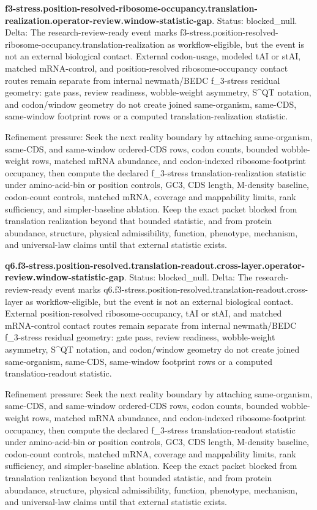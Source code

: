 \textbf{f3-stress.position-resolved-ribosome-occupancy.translation-realization.operator-review.window-statistic-gap}. Status: blocked\_null. Delta: The research-review-ready event marks f3-stress.position-resolved-ribosome-occupancy.translation-realization as workflow-eligible, but the event is not an external biological contact. External codon-usage, modeled tAI or stAI, matched mRNA-control, and position-resolved ribosome-occupancy contact routes remain separate from internal newmath/BEDC f\_3-stress residual geometry: gate pass, review readiness, wobble-weight asymmetry, S\textasciicircum{}QT notation, and codon/window geometry do not create joined same-organism, same-CDS, same-window footprint rows or a computed translation-realization statistic.

Refinement pressure: Seek the next reality boundary by attaching same-organism, same-CDS, and same-window ordered-CDS rows, codon counts, bounded wobble-weight rows, matched mRNA abundance, and codon-indexed ribosome-footprint occupancy, then compute the declared f\_3-stress translation-realization statistic under amino-acid-bin or position controls, GC3, CDS length, M-density baseline, codon-count controls, matched mRNA, coverage and mappability limits, rank sufficiency, and simpler-baseline ablation. Keep the exact packet blocked from translation realization beyond that bounded statistic, and from protein abundance, structure, physical admissibility, function, phenotype, mechanism, and universal-law claims until that external statistic exists.

\textbf{q6.f3-stress.position-resolved.translation-readout.cross-layer.operator-review.window-statistic-gap}. Status: blocked\_null. Delta: The research-review-ready event marks q6.f3-stress.position-resolved.translation-readout.cross-layer as workflow-eligible, but the event is not an external biological contact. External position-resolved ribosome-occupancy, tAI or stAI, and matched mRNA-control contact routes remain separate from internal newmath/BEDC f\_3-stress residual geometry: gate pass, review readiness, wobble-weight asymmetry, S\textasciicircum{}QT notation, and codon/window geometry do not create joined same-organism, same-CDS, same-window footprint rows or a computed translation-readout statistic.

Refinement pressure: Seek the next reality boundary by attaching same-organism, same-CDS, and same-window ordered-CDS rows, codon counts, bounded wobble-weight rows, matched mRNA abundance, and codon-indexed ribosome-footprint occupancy, then compute the declared f\_3-stress translation-readout statistic under amino-acid-bin or position controls, GC3, CDS length, M-density baseline, codon-count controls, matched mRNA, coverage and mappability limits, rank sufficiency, and simpler-baseline ablation. Keep the exact packet blocked from translation realization beyond that bounded statistic, and from protein abundance, structure, physical admissibility, function, phenotype, mechanism, and universal-law claims until that external statistic exists.


